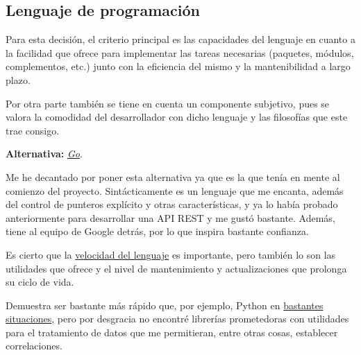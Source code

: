 \subsection{Lenguaje de programación}

Para esta decisión, el criterio principal es las capacidades del lenguaje en cuanto a la facilidad que ofrece para implementar las tareas necesarias (paquetes, módulos, complementos, etc.) junto con la eficiencia del mismo y la mantenibilidad a largo plazo.

Por otra parte también se tiene en cuenta un componente subjetivo, pues se valora la comodidad del desarrollador con dicho lenguaje y las filosofías que este trae consigo.

\textbf{Alternativa:} \href{https://go.dev/}{\textit{Go}}.

Me he decantado por poner esta alternativa ya que es la que tenía en mente al comienzo del proyecto. Sintácticamente es un lenguaje que me encanta, además del control de punteros explícito y otras características, y ya lo había probado anteriormente para desarrollar una API REST y me gustó bastante. Además, tiene al equipo de Google detrás, por lo que inspira bastante confianza.

Es cierto que la \href{https://benchmarksgame-team.pages.debian.net/benchmarksgame/index.html}{velocidad del lenguaje} es importante, pero también lo son las utilidades que ofrece y el nivel de mantenimiento y actualizaciones que prolonga su ciclo de vida.

Demuestra ser bastante más rápido que, por ejemplo, Python en \href{https://benchmarksgame-team.pages.debian.net/benchmarksgame/fastest/go-python3.html}{bastantes situaciones}, pero por desgracia no encontré librerías prometedoras con utilidades para el tratamiento de datos que me permitieran, entre otras cosas, establecer correlaciones.

